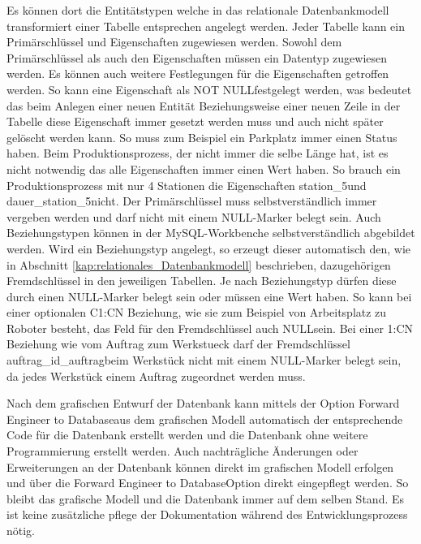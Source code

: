  Es können dort die Entitätstypen welche in das relationale Datenbankmodell transformiert einer Tabelle entsprechen angelegt werden. Jeder Tabelle kann ein Primärschlüssel und Eigenschaften zugewiesen werden. Sowohl dem Primärschlüssel als auch den Eigenschaften müssen ein Datentyp zugewiesen werden. Es können auch weitere Festlegungen für die Eigenschaften getroffen werden. So kann eine Eigenschaft als \glqq NOT NULL\grqq  festgelegt werden, was bedeutet das beim Anlegen einer neuen Entität Beziehungsweise einer neuen Zeile in der Tabelle diese Eigenschaft immer gesetzt werden muss und auch nicht später gelöscht werden kann. So muss zum Beispiel ein Parkplatz immer einen Status haben. Beim Produktionsprozess, der nicht immer die selbe Länge hat, ist es nicht notwendig das alle Eigenschaften immer einen Wert haben. So brauch ein Produktionsprozess mit nur 4 Stationen die Eigenschaften \glqq station\_5\grqq  und \glqq dauer\_station\_5\grqq  nicht. Der Primärschlüssel muss selbstverständlich immer vergeben werden und darf nicht mit einem  NULL-Marker belegt sein.
 Auch Beziehungstypen können in der MySQL-Workbenche selbstverständlich abgebildet werden. Wird ein Beziehungstyp angelegt, so erzeugt dieser automatisch den, wie in Abschnitt \ref{kap:relationales_Datenbankmodell} beschrieben, dazugehörigen Fremdschlüssel in den jeweiligen Tabellen. Je nach Beziehungstyp dürfen diese durch einen NULL-Marker belegt  sein oder müssen eine Wert haben. So kann bei einer optionalen C1:CN Beziehung, wie sie zum Beispiel von Arbeitsplatz zu Roboter besteht, das Feld für den Fremdschlüssel auch \glqq NULL\grqq  sein. Bei einer 1:CN Beziehung wie vom Auftrag zum Werkstueck darf der Fremdschlüssel \glqq auftrag\_id\_auftrag\grqq  beim Werkstück nicht mit einem NULL-Marker belegt sein, da jedes Werkstück einem Auftrag zugeordnet werden muss.
 
 Nach dem grafischen Entwurf der Datenbank kann mittels der Option \glqq Forward Engineer to Database\grqq  aus dem grafischen Modell automatisch der entsprechende Code für die Datenbank erstellt werden und die Datenbank ohne weitere Programmierung erstellt werden. Auch nachträgliche Änderungen oder Erweiterungen an der Datenbank können direkt im grafischen Modell erfolgen und über die \glqq Forward Engineer to Database\grqq  Option direkt eingepflegt werden. So bleibt das grafische Modell und die Datenbank immer auf dem selben Stand. Es ist keine zusätzliche pflege der Dokumentation während des Entwicklungsprozess nötig. 
 
